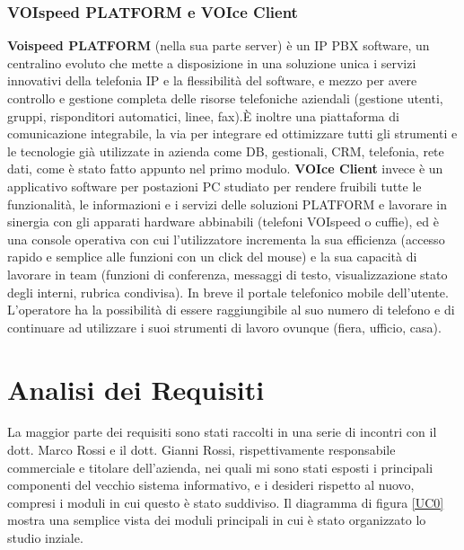 \subsection{VOIspeed PLATFORM e VOIce Client}
\textbf{Voispeed PLATFORM} (nella sua parte server) \`e un IP PBX software, un centralino evoluto che mette a disposizione in una soluzione unica i servizi innovativi della telefonia IP e la flessibilit\`a del software, e mezzo per avere controllo e gestione completa delle risorse telefoniche aziendali (gestione utenti, gruppi, risponditori automatici, linee, fax).\`E inoltre una piattaforma di comunicazione integrabile, la via per integrare ed ottimizzare tutti gli strumenti e le tecnologie gi\`a utilizzate in azienda come DB, gestionali, CRM, telefonia, rete dati, come \`e stato fatto appunto nel primo modulo. 
\textbf{VOIce Client} invece \`e un applicativo software per postazioni PC studiato per rendere fruibili tutte le funzionalit\`a, le informazioni e i servizi delle soluzioni PLATFORM e lavorare in sinergia con gli apparati hardware abbinabili (telefoni VOIspeed o cuffie), ed \`e una console operativa con cui l'utilizzatore incrementa la sua efficienza (accesso rapido e semplice alle funzioni con un click del mouse) e la sua capacit\`a di lavorare in team (funzioni di conferenza, messaggi di testo, visualizzazione stato degli interni, rubrica condivisa). In breve il portale telefonico mobile dell'utente. L'operatore ha la possibilit\`a di essere raggiungibile al suo numero di telefono e di continuare ad utilizzare i suoi strumenti di lavoro ovunque (fiera, ufficio, casa). 

\chapter{Analisi dei Requisiti}
La maggior parte dei requisiti sono stati raccolti in una serie di incontri con il dott. Marco Rossi e il dott. Gianni Rossi, rispettivamente responsabile commerciale e titolare dell'azienda, nei quali mi sono stati esposti i principali componenti del vecchio sistema informativo, e i desideri rispetto al nuovo, compresi i moduli in cui questo \`e stato suddiviso. Il diagramma di figura \ref{UC0} mostra una semplice vista dei moduli principali in cui \`e stato organizzato lo studio inziale.

